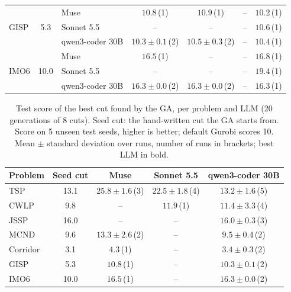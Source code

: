 \begin{table}[t]
\begin{tabular}{@{}l c l cccc@{}}
\midrule
\multirow{3}{*}{GISP} & \multirow{3}{*}{5.3} & Muse & $10.8$\,{\scriptsize(1)} & $\mathbf{10.9}$\,{\scriptsize(1)} & -- & $10.2$\,{\scriptsize(1)} \\
 &  & Sonnet 5.5 & -- & -- & -- & $\mathbf{10.6}$\,{\scriptsize(1)} \\
 &  & qwen3-coder 30B & $10.3 \pm 0.1$\,{\scriptsize(2)} & $\mathbf{10.5} \pm 0.3$\,{\scriptsize(2)} & -- & $10.4$\,{\scriptsize(1)} \\
\midrule
\multirow{3}{*}{IMO6} & \multirow{3}{*}{10.0} & Muse & $16.5$\,{\scriptsize(1)} & -- & -- & $\mathbf{16.8}$\,{\scriptsize(1)} \\
 &  & Sonnet 5.5 & -- & -- & -- & $\mathbf{19.4}$\,{\scriptsize(1)} \\
 &  & qwen3-coder 30B & $\mathbf{16.3} \pm 0.0$\,{\scriptsize(2)} & $\mathbf{16.3} \pm 0.0$\,{\scriptsize(2)} & -- & $\mathbf{16.3}$\,{\scriptsize(1)} \\
\bottomrule
\end{tabular}
\end{table}

\begin{table}[t]
\centering
\small
\caption{Test score of the best cut found by the GA, per problem and LLM (20 generations of 8 cuts). Seed cut: the hand-written cut the GA starts from. Score on 5 unseen test seeds, higher is better; default Gurobi scores 10. Mean $\pm$ standard deviation over runs, number of runs in brackets; best LLM in bold.}
\label{tab:ga-per-problem}
\begin{tabular}{@{}l c ccc@{}}
\toprule
Problem & Seed cut & Muse & Sonnet 5.5 & qwen3-coder 30B \\
\midrule
TSP & 13.1 & $\mathbf{25.8} \pm 1.6$\,{\scriptsize(3)} & $22.5 \pm 1.8$\,{\scriptsize(4)} & $13.2 \pm 1.6$\,{\scriptsize(5)} \\
CWLP & 9.8 & -- & $\mathbf{11.9}$\,{\scriptsize(1)} & $11.4 \pm 3.3$\,{\scriptsize(4)} \\
JSSP & 16.0 & -- & -- & $\mathbf{16.0} \pm 0.3$\,{\scriptsize(3)} \\
MCND & 9.6 & $\mathbf{13.3} \pm 2.6$\,{\scriptsize(2)} & -- & $9.5 \pm 0.4$\,{\scriptsize(2)} \\
Corridor & 3.1 & $\mathbf{4.3}$\,{\scriptsize(1)} & -- & $3.4 \pm 0.3$\,{\scriptsize(2)} \\
GISP & 5.3 & $\mathbf{10.8}$\,{\scriptsize(1)} & -- & $10.3 \pm 0.1$\,{\scriptsize(2)} \\
IMO6 & 10.0 & $\mathbf{16.5}$\,{\scriptsize(1)} & -- & $16.3 \pm 0.0$\,{\scriptsize(2)} \\
\bottomrule
\end{tabular}
\end{table}

